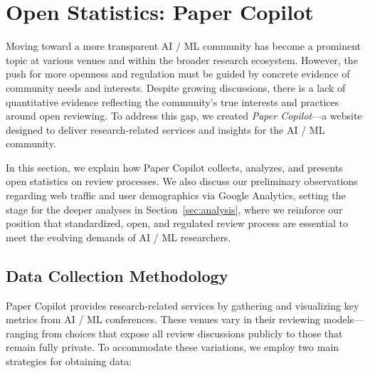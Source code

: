 
\section{Open Statistics: Paper Copilot}
\label{sec:paper_copilot}

Moving toward a more transparent AI / ML community has become a prominent topic at various venues and within the broader research ecosystem. However, the push for more openness and regulation must be guided by concrete evidence of community needs and interests. Despite growing discussions, there is a lack of quantitative evidence reflecting the community’s true interests and practices around open reviewing. To address this gap, we created \textit{Paper Copilot}—a website designed to deliver research-related services and insights for the AI / ML community.

In this section, we explain how Paper Copilot collects, analyzes, and presents open statistics on review processes. We also discuss our preliminary observations regarding web traffic and user demographics via Google Analytics, setting the stage for the deeper analyses in Section~\ref{sec:analysis}, where we reinforce our position that standardized, open, and regulated review process are essential to meet the evolving demands of AI / ML researchers.

\subsection{Data Collection Methodology}

Paper Copilot provides research-related services by gathering and visualizing key metrics from AI / ML conferences. These venues vary in their reviewing models—ranging from choices that expose all review discussions publicly to those that remain fully private. To accommodate these variations, we employ two main strategies for obtaining data:

